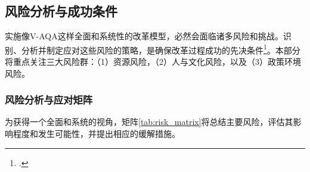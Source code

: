 \subsection{风险分析与成功条件}
\label{subsec:risk_analysis_conditions}

实施像V-AQA这样全面和系统性的改革模型，必然会面临诸多风险和挑战。识别、分析并制定应对这些风险的策略，是确保改革过程成功的先决条件\footcite{kerzner_pm_2017}。本部分将重点关注三大风险群：（1）资源风险，（2）人与文化风险，以及（3）政策环境风险。

\subsubsection{风险分析与应对矩阵}
为获得一个全面和系统的视角，矩阵\ref{tab:risk_matrix}将总结主要风险，评估其影响程度和发生可能性，并提出相应的缓解措施。

